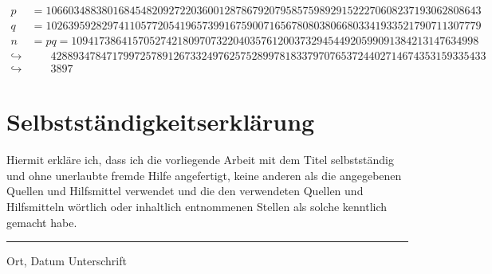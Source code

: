 \begin{equation}
  \begin{split}
    p&=106603488380168454820927220360012878679207958575989291522270608237193062808643\\
    q&=102639592829741105772054196573991675900716567808038066803341933521790711307779\\
    n&=pq=1094173864157052742180970732204035761200373294544920599091384213147634998\\\hookrightarrow&\phantom{=}\;\,428893478471799725789126733249762575289978183379707653724402714674353159335433\\\hookrightarrow&\phantom{=}\;\,3897
  \end{split}
\end{equation}




\newpage

\section{Selbstständigkeitserklärung}

Hiermit erkläre ich, dass ich die vorliegende Arbeit mit dem Titel  selbstständig und ohne unerlaubte fremde Hilfe angefertigt, keine anderen als die angegebenen Quellen und Hilfsmittel verwendet und die den verwendeten Quellen und Hilfsmitteln wörtlich oder inhaltlich entnommenen Stellen als solche kenntlich gemacht habe.
\vspace{4em}

\hrule width25em
\vspace{0.5em}
Ort, Datum\hspace{11.5em} Unterschrift
